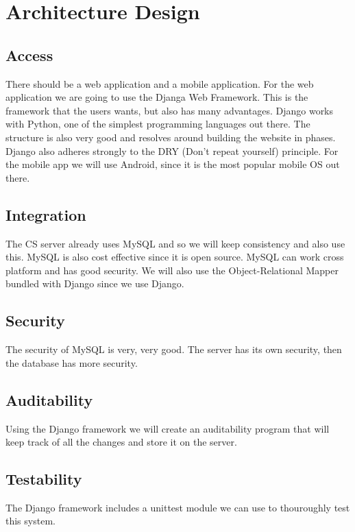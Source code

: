 \documentclass[a4paper]{article}
\begin{document}
\section{Architecture Design}

\subsection{Access}

There should be a web application and a mobile application. For the web application we are going to use the Djanga Web Framework. This is the framework that the users wants, but also has many advantages. Django works with Python, one of the simplest programming languages out there. The structure is also very good and resolves around building the website in phases. Django also adheres strongly to the DRY (Don't repeat yourself) principle. For the mobile app we will use Android, since it is the most popular mobile OS out there.

\subsection{Integration}

The CS server already uses MySQL and so we will keep consistency and also use this. MySQL is also cost effective since it is open source. MySQL can work cross platform and has good security. We will also use the Object-Relational Mapper bundled with Django since we use Django.

\subsection{Security}

The security of MySQL is very, very good. The server has its own security, then the database has more security.

\subsection{Auditability}

Using the Django framework we will create an auditability program that will keep track of all the changes and store it on the server.

\subsection{Testability}

The Django framework includes a unittest module we can use to thouroughly test this system.
\end{document}

